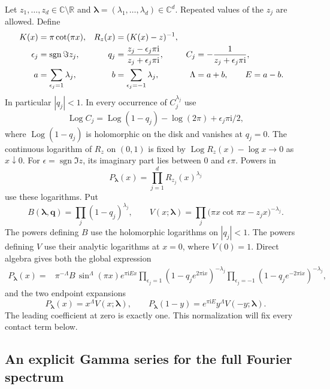 \documentclass[11pt]{article}
\numberwithin{equation}{section}
\theoremstyle{plain}
\theoremstyle{definition}
\theoremstyle{remark}
\DeclareMathOperator{\Log}{Log}
\DeclareMathOperator{\sgn}{sgn}
\newcommand{\C}{\mathbb C}
\newcommand{\R}{\mathbb R}
\newcommand{\ii}{\mathrm i}
\begin{document}
Let $z_1,\ldots,z_d\in\C\setminus\R$ and
$\boldsymbol\lambda=(\lambda_1,\ldots,\lambda_d)\in\C^d$. Repeated
values of the $z_j$ are allowed. Define
\begin{align}
 K(x)&=\pi\cot(\pi x),& R_z(x)&=(K(x)-z)^{-1},\notag\\
 \epsilon_j&=\sgn\Im z_j,&
 q_j&=\frac{z_j-\epsilon_j\pi\ii}{z_j+\epsilon_j\pi\ii},&
 C_j&=-\frac1{z_j+\epsilon_j\pi\ii},\label{mr:diskdata}\\
 a&=\sum_{\epsilon_j=1}\lambda_j,&
 b&=\sum_{\epsilon_j=-1}\lambda_j,&
 \Lambda&=a+b,\qquad E=a-b.\notag
\end{align}
In particular $|q_j|<1$. In every occurrence of $C_j^{\lambda_j}$ use
\[
 \Log C_j=\Log(1-q_j)-\log(2\pi)+\epsilon_j\pi\ii/2,
\]
where $\Log(1-q_j)$ is holomorphic on the disk and vanishes at $q_j=0$.
The continuous logarithm of $R_z$ on $(0,1)$
is fixed by $\Log R_z(x)-\log x\to0$ as $x\downarrow0$. For
$\epsilon=\sgn\Im z$, its imaginary part lies between $0$ and
$\epsilon\pi$. Powers in
\begin{equation}\label{mr:kernel}
 P_{\boldsymbol\lambda}(x)
       =\prod_{j=1}^d R_{z_j}(x)^{\lambda_j}
\end{equation}
use these logarithms. Put
\[
 B(\boldsymbol\lambda,\mathbf q)
       =\prod_j(1-q_j)^{\lambda_j},
 \qquad
 V(x;\boldsymbol\lambda)
       =\prod_j\bigl(\pi x\cot\pi x-z_jx\bigr)^{-\lambda_j}.
\]
The powers defining $B$ use the holomorphic logarithms on $|q_j|<1$.
The powers defining $V$ use their analytic logarithms at $x=0$, where
$V(0)=1$. Direct algebra gives both the global expression
\begin{align}
 P_{\boldsymbol\lambda}(x)
  ={}&\pi^{-\Lambda}B\,\sin^{\Lambda}(\pi x)e^{\pi\ii E x}
       \prod_{\epsilon_j=1}(1-q_je^{2\pi\ii x})^{-\lambda_j}
       \prod_{\epsilon_j=-1}(1-q_je^{-2\pi\ii x})^{-\lambda_j},
       \label{mr:sinefactor}
\end{align}
and the two endpoint expansions
\begin{equation}\label{mr:endpoints}
 P_{\boldsymbol\lambda}(x)=x^\Lambda V(x;\boldsymbol\lambda),\qquad
 P_{\boldsymbol\lambda}(1-y)
       =e^{\pi\ii E}y^\Lambda V(-y;\boldsymbol\lambda).
\end{equation}
The leading coefficient at zero is exactly one. This normalization
will fix every contact term below.

\subsection{An explicit Gamma series for the full Fourier spectrum}
\end{document}
